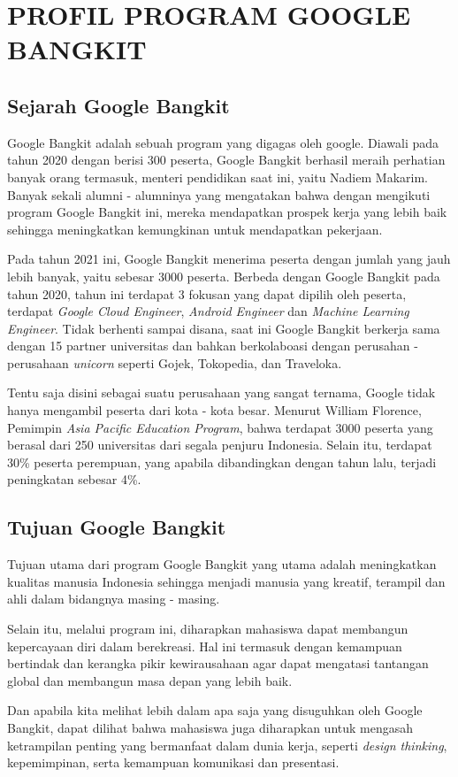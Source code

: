 \chapter{PROFIL PROGRAM GOOGLE BANGKIT}


\section{Sejarah Google Bangkit}

Google Bangkit adalah sebuah program yang digagas oleh google. Diawali pada tahun 2020 dengan berisi 300 peserta, Google Bangkit berhasil meraih perhatian banyak orang termasuk, menteri pendidikan saat ini, yaitu Nadiem Makarim. Banyak sekali alumni - alumninya yang mengatakan bahwa dengan mengikuti program Google Bangkit ini, mereka mendapatkan prospek kerja yang lebih baik sehingga meningkatkan kemungkinan untuk mendapatkan pekerjaan.

Pada tahun 2021 ini, Google Bangkit menerima peserta dengan jumlah yang jauh lebih banyak, yaitu sebesar 3000 peserta. Berbeda dengan Google Bangkit pada tahun 2020, tahun ini terdapat 3 fokusan yang dapat dipilih oleh peserta, terdapat \textit{Google Cloud Engineer}, \textit{Android Engineer} dan \textit{Machine Learning Engineer}. Tidak berhenti sampai disana, saat ini Google Bangkit berkerja sama dengan 15 partner universitas dan bahkan berkolaboasi dengan perusahan - perusahaan \textit{unicorn} seperti Gojek, Tokopedia, dan Traveloka.

Tentu saja disini sebagai suatu perusahaan yang sangat ternama, Google tidak hanya mengambil peserta dari kota - kota besar. Menurut William Florence, Pemimpin \textit{Asia Pacific Education Program}, bahwa terdapat 3000 peserta yang berasal dari 250 universitas dari segala penjuru Indonesia.  Selain itu, terdapat 30\% peserta perempuan, yang apabila dibandingkan dengan tahun lalu, terjadi peningkatan sebesar 4\%.

\section{Tujuan Google Bangkit}

Tujuan utama dari program Google Bangkit yang utama adalah meningkatkan kualitas manusia Indonesia sehingga menjadi manusia yang kreatif, terampil dan ahli dalam bidangnya masing - masing.

Selain itu, melalui program ini, diharapkan mahasiswa dapat membangun kepercayaan diri dalam berekreasi. Hal ini termasuk dengan kemampuan bertindak dan kerangka pikir kewirausahaan agar dapat mengatasi tantangan global dan membangun masa depan yang lebih baik.

Dan apabila kita melihat lebih dalam apa saja yang disuguhkan oleh Google Bangkit, dapat dilihat bahwa mahasiswa juga diharapkan untuk mengasah ketrampilan penting yang bermanfaat dalam dunia kerja, seperti \textit{design thinking}, kepemimpinan, serta kemampuan komunikasi dan presentasi.


